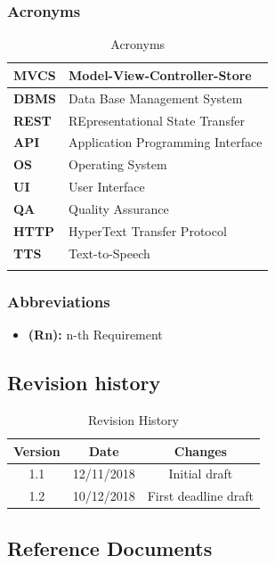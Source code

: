\documentclass[titlepage]{article}
\begin{document}
	
	\subsubsection{Acronyms}
	
	\begin{longtable}{| p{2 cm} | p{7 cm} |} \\ \hline
		{\bf MVCS} & Model-View-Controller-Store \\ \hline
		{\bf DBMS} & Data Base Management System \\ \hline
		{\bf REST} & REpresentational State Transfer \\ \hline
		{\bf API} & Application Programming Interface \\ \hline
		{\bf OS} & Operating System\\ \hline
		{\bf UI} & User Interface \\ \hline
		{\bf QA} & Quality Assurance \\ \hline		
		{\bf HTTP} & HyperText Transfer Protocol \\ \hline	
		{\bf TTS} & Text-to-Speech \\ \hline
		\caption{Acronyms}							
	\end{longtable}

	\subsubsection{Abbreviations}
	
	\begin{itemize}
		\item {\bf (Rn):} n-th Requirement
	\end{itemize}
			
			
\subsection{Revision history}

\begin{table}[ht]
	\centering
	\begin{tabular}{ccc} 
		Version & Date & Changes  \\ 
		\hline
		1.1 & 12/11/2018 & Initial draft \\
		1.2 & 10/12/2018 & First deadline draft \\
	\end{tabular}
	\caption{Revision History}
	\label{default}
\end{table}
	
	
\subsection{Reference Documents}
\end{document}
